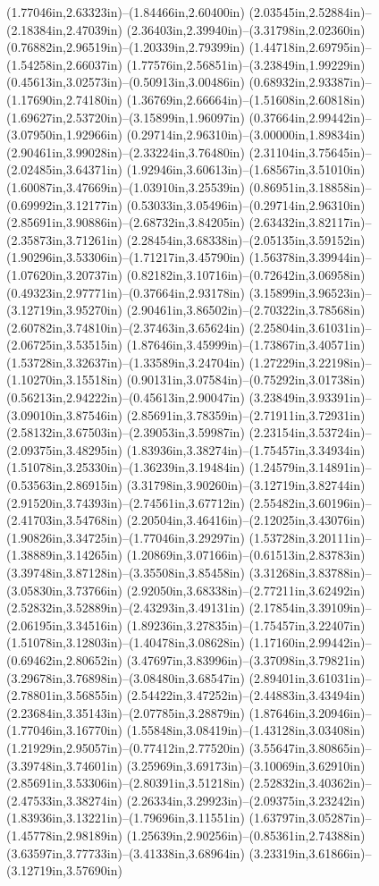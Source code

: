 (1.77046in,2.63323in)--(1.84466in,2.60400in) (2.03545in,2.52884in)--(2.18384in,2.47039in) (2.36403in,2.39940in)--(3.31798in,2.02360in) (0.76882in,2.96519in)--(1.20339in,2.79399in) (1.44718in,2.69795in)--(1.54258in,2.66037in) (1.77576in,2.56851in)--(3.23849in,1.99229in) (0.45613in,3.02573in)--(0.50913in,3.00486in) (0.68932in,2.93387in)--(1.17690in,2.74180in) (1.36769in,2.66664in)--(1.51608in,2.60818in) (1.69627in,2.53720in)--(3.15899in,1.96097in) (0.37664in,2.99442in)--(3.07950in,1.92966in) (0.29714in,2.96310in)--(3.00000in,1.89834in) (2.90461in,3.99028in)--(2.33224in,3.76480in) (2.31104in,3.75645in)--(2.02485in,3.64371in) (1.92946in,3.60613in)--(1.68567in,3.51010in) (1.60087in,3.47669in)--(1.03910in,3.25539in) (0.86951in,3.18858in)--(0.69992in,3.12177in) (0.53033in,3.05496in)--(0.29714in,2.96310in) (2.85691in,3.90886in)--(2.68732in,3.84205in) (2.63432in,3.82117in)--(2.35873in,3.71261in) (2.28454in,3.68338in)--(2.05135in,3.59152in) (1.90296in,3.53306in)--(1.71217in,3.45790in) (1.56378in,3.39944in)--(1.07620in,3.20737in) (0.82182in,3.10716in)--(0.72642in,3.06958in) (0.49323in,2.97771in)--(0.37664in,2.93178in) (3.15899in,3.96523in)--(3.12719in,3.95270in) (2.90461in,3.86502in)--(2.70322in,3.78568in) (2.60782in,3.74810in)--(2.37463in,3.65624in) (2.25804in,3.61031in)--(2.06725in,3.53515in) (1.87646in,3.45999in)--(1.73867in,3.40571in) (1.53728in,3.32637in)--(1.33589in,3.24704in) (1.27229in,3.22198in)--(1.10270in,3.15518in) (0.90131in,3.07584in)--(0.75292in,3.01738in) (0.56213in,2.94222in)--(0.45613in,2.90047in) (3.23849in,3.93391in)--(3.09010in,3.87546in) (2.85691in,3.78359in)--(2.71911in,3.72931in) (2.58132in,3.67503in)--(2.39053in,3.59987in) (2.23154in,3.53724in)--(2.09375in,3.48295in) (1.83936in,3.38274in)--(1.75457in,3.34934in) (1.51078in,3.25330in)--(1.36239in,3.19484in) (1.24579in,3.14891in)--(0.53563in,2.86915in) (3.31798in,3.90260in)--(3.12719in,3.82744in) (2.91520in,3.74393in)--(2.74561in,3.67712in) (2.55482in,3.60196in)--(2.41703in,3.54768in) (2.20504in,3.46416in)--(2.12025in,3.43076in) (1.90826in,3.34725in)--(1.77046in,3.29297in) (1.53728in,3.20111in)--(1.38889in,3.14265in) (1.20869in,3.07166in)--(0.61513in,2.83783in) (3.39748in,3.87128in)--(3.35508in,3.85458in) (3.31268in,3.83788in)--(3.05830in,3.73766in) (2.92050in,3.68338in)--(2.77211in,3.62492in) (2.52832in,3.52889in)--(2.43293in,3.49131in) (2.17854in,3.39109in)--(2.06195in,3.34516in) (1.89236in,3.27835in)--(1.75457in,3.22407in) (1.51078in,3.12803in)--(1.40478in,3.08628in) (1.17160in,2.99442in)--(0.69462in,2.80652in) (3.47697in,3.83996in)--(3.37098in,3.79821in) (3.29678in,3.76898in)--(3.08480in,3.68547in) (2.89401in,3.61031in)--(2.78801in,3.56855in) (2.54422in,3.47252in)--(2.44883in,3.43494in) (2.23684in,3.35143in)--(2.07785in,3.28879in) (1.87646in,3.20946in)--(1.77046in,3.16770in) (1.55848in,3.08419in)--(1.43128in,3.03408in) (1.21929in,2.95057in)--(0.77412in,2.77520in) (3.55647in,3.80865in)--(3.39748in,3.74601in) (3.25969in,3.69173in)--(3.10069in,3.62910in) (2.85691in,3.53306in)--(2.80391in,3.51218in) (2.52832in,3.40362in)--(2.47533in,3.38274in) (2.26334in,3.29923in)--(2.09375in,3.23242in) (1.83936in,3.13221in)--(1.79696in,3.11551in) (1.63797in,3.05287in)--(1.45778in,2.98189in) (1.25639in,2.90256in)--(0.85361in,2.74388in) (3.63597in,3.77733in)--(3.41338in,3.68964in) (3.23319in,3.61866in)--(3.12719in,3.57690in) 